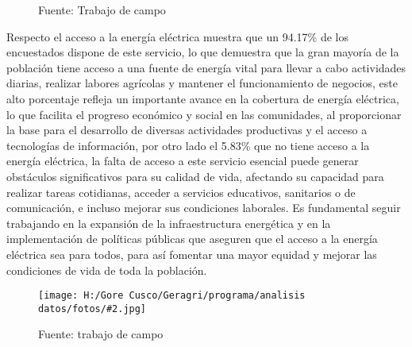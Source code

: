 \documentclass{article}\usepackage[]{graphicx}\usepackage[table]{xcolor}
\makeatletter
\newenvironment{kframe}{%
 \def\at@end@of@kframe{}%
 \ifinner\ifhmode%
  \def\at@end@of@kframe{\end{minipage}}%
  \begin{minipage}{\columnwidth}%
 \fi\fi%
 \def\FrameCommand##1{\hskip\@totalleftmargin \hskip-\fboxsep
 \colorbox{shadecolor}{##1}\hskip-\fboxsep
     \hskip-\linewidth \hskip-\@totalleftmargin \hskip\columnwidth}%
 \MakeFramed {\advance\hsize-\width
   \@totalleftmargin\z@ \linewidth\hsize
   \@setminipage}}%
 {\par\unskip\endMakeFramed%
 \at@end@of@kframe}
\newenvironment{knitrout}{}{} %
\newenvironment{fotos}[2]
{\begin{figure}[H]
	\centering
	\caption{#1}
	\texttt{[image: H:/Gore Cusco/Geragri/programa/analisis datos/fotos/\#2.jpg]}
	\caption*{Fuente: trabajo de campo}}
{\end{figure}}
\makeatother
\begin{document}
\begin{figure}[H]
  \centering
  \caption{Energia electrica}
\begin{knitrout}
\color{fgcolor}\begin{kframe}


{\ttfamily\noindent\bfseries{}}

{\ttfamily\noindent{}}

{\ttfamily\noindent\bfseries{}}

{\ttfamily\noindent\bfseries\color{errorcolor}{\#\# Error: objeto 'datos' no encontrado}}

{\ttfamily\noindent\bfseries\color{errorcolor}{\#\# Error: objeto 'datos' no encontrado}}

{\ttfamily\noindent\bfseries\color{errorcolor}{\#\# Error: objeto 'datos' no encontrado}}

{\ttfamily\noindent\bfseries\color{errorcolor}{\#\# Error: objeto 'graph1' no encontrado}}\end{kframe}
\end{knitrout}
  \caption*{Fuente: Trabajo de campo}
\end{figure}
Respecto el acceso a la energía eléctrica muestra que un 94.17\% de los encuestados dispone de este servicio, lo que demuestra que la gran mayoría de la población tiene acceso a una fuente de energía vital para llevar a cabo actividades diarias, realizar labores agrícolas y mantener el funcionamiento de negocios, este alto porcentaje refleja un importante avance en la cobertura de energía eléctrica, lo que facilita el progreso económico y social en las comunidades, al proporcionar la base para el desarrollo de diversas actividades productivas y el acceso a tecnologías de información, por otro lado el 5.83\% que no tiene acceso a la energía eléctrica, la falta de acceso a este servicio esencial puede generar obstáculos significativos para su calidad de vida, afectando su capacidad para realizar tareas cotidianas, acceder a servicios educativos, sanitarios o de comunicación, e incluso mejorar sus condiciones laborales. Es fundamental seguir trabajando en la expansión de la infraestructura energética y en la implementación de políticas públicas que aseguren que el acceso a la energía eléctrica sea para todos, para así fomentar una mayor equidad y mejorar las condiciones de vida de toda la población.
\begin{fotos}
{sensibilizacion a la poblacion}{10}
\end{fotos}
\end{document}
